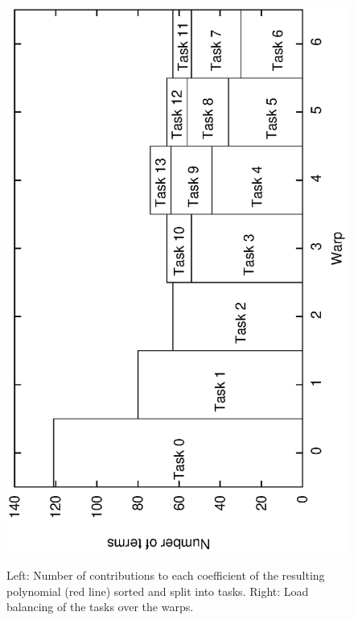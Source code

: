 \documentclass[oribibl,a4paper]{llncs2e/llncs}
\begin{document}
\begin{figure}[t]
{        \includegraphics[scale=0.37, angle=-90]{warp.eps} 
    }
    \caption{Left: Number of contributions to each coefficient of the resulting polynomial (red line) sorted and split into tasks. Right: Load balancing of the tasks over the warps.}
    \label{fig:GPU_load_balance}
\end{figure}
\end{document}
